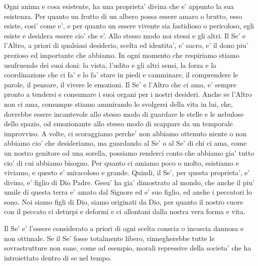  Ogni anima e cosa esistente, ha una proprieta' divina che e' appunto la sua esistenza. Per quanto un frutto di un albero possa essere amaro o brutto, esso esiste, cosi' come e', e per quanto un essere vivente sia fastidioso o pericoloso, egli esiste e desidera essere cio' che e'. Allo stesso modo noi stessi e gli altri.  Il Se' e l'Altro, a priori di qualsiasi desiderio, scelta ed identita', e' sacro, e' il dono piu' prezioso ed importante che abbiamo. In ogni momento che respiriamo stiamo usufruendo dei suoi doni: la vista, l'udito e gli altri sensi, la forza e la coordinazione che ci fa' e lo fa' stare in piedi e camminare, il comprendere le parole, il pensare, il vivere le emozioni. Il Se' e l'Altro che ci ama, e' sempre pronto a tendersi e consumare i suoi organi per i nostri desideri. Anche se l'Altro non ci ama, comunque stiamo ammirando lo svolgersi della vita in lui, che, dovrebbe essere incantevole allo stesso modo di guardare le stelle e le nebulose dello spazio, od emozionante allo stesso modo di scappare da un temporale improvviso. A volte, ci scoraggiamo perche' non abbiamo ottenuto niente o non abbiamo cio' che desideriamo, ma guardando al Se' o al Se' di chi ci ama, come un nostro genitore od una sorella, possiamo renderci conto che abbiamo gia' tutto cio' di cui abbiamo bisogno.
Per quanto ci amiamo poco o molto, esistiamo e viviamo, e questo e' miracoloso e grande. Quindi, il Se', per questa proprieta', e' divino, e' figlio di Dio Padre. Gesu' ha gia' dimostrato al mondo, che anche il piu' umile di questa terra e' amato dal Signore ed e' suo figlio, ed anche i peccatori lo sono. Noi siamo figli di Dio, siamo originati da Dio, per quanto il nostro cuore con il peccato ci deturpi e deformi e ci allontani dalla nostra vera forma e vita.

Il Se' e' l'essere considerato a priori di ogni scelta conscia o incoscia dannosa e non ottimale. Se il Se' fosse totalmente libero, rinnegherebbe tutte le sovrastrutture non sane, come ad esempio, morali repressive della societa' che ha introiettato dentro di se nel tempo.

